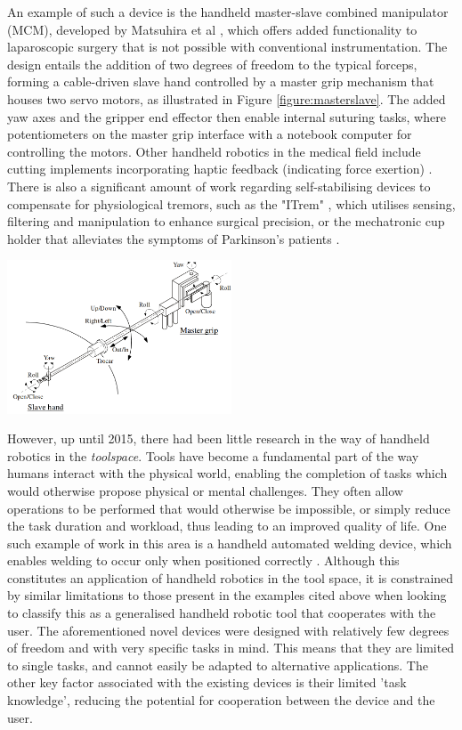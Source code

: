 \documentclass[11pt]{article}
\begin{document}
An example of such a device is the handheld master-slave combined manipulator (MCM), developed by Matsuhira et al \cite{Matsuhira2002}, which offers added functionality to laparoscopic surgery that is not possible with conventional instrumentation. The design entails the addition of two degrees of freedom to the typical forceps, forming a cable-driven slave hand controlled by a master grip mechanism that houses two servo motors, as illustrated in Figure \ref{figure:masterslave}. The added yaw axes and the gripper end effector then enable internal suturing tasks, where potentiometers on the master grip interface with a notebook computer for controlling the motors. Other handheld robotics in the medical field include cutting implements incorporating haptic feedback (indicating force exertion) \cite{Payne2015}. There is also a significant amount of work regarding self-stabilising devices to compensate for physiological tremors, such as the  "ITrem" \cite{Latt2009}, which utilises sensing, filtering and manipulation to enhance surgical precision, or the mechatronic cup holder that alleviates the symptoms of Parkinson's patients \cite{Fischer2010}.

\begin{center}
\includegraphics[width=0.5\textwidth]{laparascopic.png}
\label{figure:masterslave}
\end{center}

However, up until 2015, there had been little research in the way of handheld robotics in the \textit{toolspace}. Tools have become a fundamental part of the way humans interact with the physical world, enabling the completion of tasks which would otherwise propose physical or mental challenges. They often allow operations to be performed that would otherwise be impossible, or simply reduce the task duration and workload, thus leading to an improved quality of life. One such example of work in this area is a handheld automated welding device, which enables welding to occur only when positioned correctly \cite{Echtler2004}. Although this constitutes an application of handheld robotics in the tool space, it is constrained by similar limitations to those present in the examples cited above when looking to classify this as a generalised handheld robotic tool that cooperates with the user. The aforementioned novel devices were designed with relatively few degrees of freedom and with very specific tasks in mind. This means that they are limited to single tasks, and cannot easily be adapted to alternative applications. The other key factor associated with the existing devices is their limited 'task knowledge', reducing the potential for cooperation between the device and the user.
\end{document}
